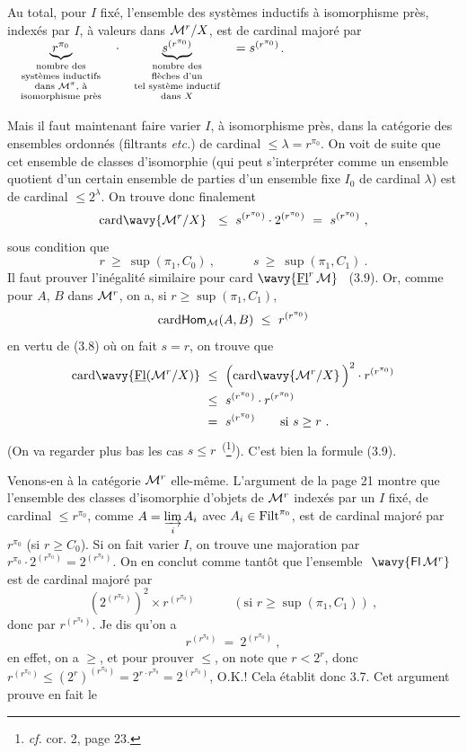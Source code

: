 Au total, pour $I$ fixé, l'ensemble des systèmes inductifs à isomorphisme près, indexés par $I$, à valeurs dans $\mathcal{M}^r/X$, est  de cardinal majoré par $\quad\underbrace{r^{\pi_0}}_{\text{\scriptsize\begin{tabular}{@{}c@{}}nombre des\\ systèmes inductifs\\ dans $\M^\pi$, à\\ isomorphisme près\end{tabular}}}\quad\cdot\quad\underbrace{s^{(r^{\pi_0})}}_{\text{\scriptsize\begin{tabular}{@{}c@{}}nombre des\\ flèches d'un\\ tel système inductif\\ dans $X$\end{tabular}}}\quad=s^{(r^{\pi_0})}$.

Mais il faut maintenant faire varier $I$, à isomorphisme près, dans la catégorie des ensembles ordonnés (filtrants \textit{etc.}) de cardinal $\leq\lambda=r^{\pi_0}$. On voit de suite que cet ensemble de classes d'isomorphie (qui peut s'interpréter comme un ensemble quotient d'un certain ensemble de parties d'un ensemble fixe $I_0$ de cardinal $\lambda$) est de cardinal $\leq 2^\lambda$. On trouve donc finalement
\[
\card\wavy{\M^r/X}\ \ \leq\ s^{(r^{\pi_0})}\cdot 2^{(r^{\pi_0})}\ =\ s^{(r^{\pi_0})}\ ,
\]
sous condition que
\[
r\ \geq\ \sup(\pi_1,C_0)\ ,\qquad\quad s\ \geq\ \sup(\pi_1,C_1)\ .
\]
Il faut prouver l'inégalité similaire pour card $\wavy{\uFl^r\,\M}$ \ (3.9). Or, comme pour $A$, $B$ dans $\mathcal{M}^r$, on a, si $r\geq\sup(\pi_1,C_1)$,
\[
\card\Hom_{\M}(A,B)\ \leq\ r^{(r^{\pi_0})}
\]
en vertu de (3.8) où on fait $s=r$, on trouve que
\[
\begin{aligned}
\card\wavy{\uFl(\M^r/X)}\ &\leq\ \Bigl(\card\wavy{\M^r/X}\,\Bigr)^2\cdot r^{(r^{\pi_0})}\\
&\leq\ s^{(r^{\pi_0})}\cdot r^{(r^{\pi_0})}\\
&=\ s^{(r^{\pi_0})}\qquad\text{si } s\geq r\ .
\end{aligned}
\]
(On va regarder plus bas les cas $s\leq r$~\textsuperscript{(}\footnote[8]{\textit{cf.} cor. 2, page 23.}\textsuperscript{)}). C'est bien la formule (3.9).

Venons-en à la catégorie $\mathcal{M}^r$ elle-même. L'argument de la page 21 montre que l'ensemble des classes d'isomorphie d'objets de $\mathcal{M}^r$ indexés par un $I$ fixé, de cardinal $\leq r^{\pi_0}$, comme $A=\varinjlim\limits_i A_i$ avec $A_i\in\mathrm{Filt}^{\pi_0}$, est de cardinal majoré par $r^{\pi_0}$ (si $r\geq C_0$). Si on fait varier $I$, on trouve une majoration par $r^{\pi_0}\cdot 2^{(r^{\pi_0})}=2^{(r^{\pi_0})}$. On en conclut comme tantôt que l'ensemble $\ \wavy{\Fl\,\M^r}$ est de cardinal majoré par
\[
(2^{(r^{\pi_0})})^2\times r^{(r^{\pi_0})}\qquad\quad(\text{si } r\geq\sup(\pi_1,C_1))\ ,
\]
donc par $r^{(r^{\pi_0})}$. Je dis qu'on a
\[
r^{(r^{\pi_0})}\ =\ 2^{(r^{\pi_0})}\ ,
\]
en effet, on a $\geq$, et pour prouver $\leq$, on note que $r<2^r$, donc $r^{(r^{\pi_0})}\leq(2^r)^{(r^{\pi_0})}=2^{r\cdot r^{\pi_0}}=2^{(r^{\pi_0})}$, O.K.! Cela établit donc 3.7. Cet argument prouve en fait le

